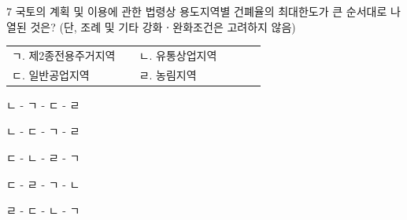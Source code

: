 \begin{question}{7}
국토의 계획 및 이용에 관한 법령상 용도지역별 건폐율의 최대한도가 큰 순서대로 나열된 것은? (단, 조례 및 기타 강화ㆍ완화조건은 고려하지 않음)
\begin{framedtext}
\begin{tabular}{@{}p{0.45\linewidth}p{0.45\linewidth}@{}}
ㄱ. 제2종전용주거지역 & ㄴ. 유통상업지역 \tabularnewline
ㄷ. 일반공업지역 & ㄹ. 농림지역 \tabularnewline
\end{tabular}
\end{framedtext}
\begin{choices}
  \item ㄴ - ㄱ - ㄷ - ㄹ
  \item ㄴ - ㄷ - ㄱ - ㄹ
  \item ㄷ - ㄴ - ㄹ - ㄱ
  \item ㄷ - ㄹ - ㄱ - ㄴ
  \item ㄹ - ㄷ - ㄴ - ㄱ
\end{choices}
\end{question}
